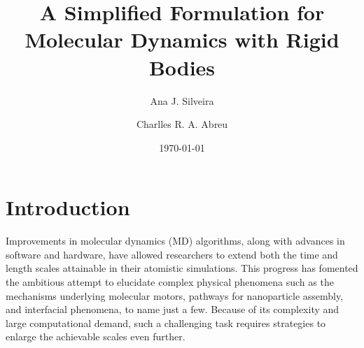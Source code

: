 \documentclass[aip,jcp,reprint,amsmath,amssymb]{revtex4-1}
\begin{document}
\title{A Simplified Formulation for Molecular Dynamics with Rigid Bodies}

\author{Ana J. Silveira}

\author{Charlles R. A. Abreu}

\date{\today}

\maketitle

\section{Introduction}

Improvements in molecular dynamics (MD) algorithms, along with advances in software and hardware, have allowed researchers to extend both the time and length scales attainable in their atomistic simulations. This progress has fomented the ambitious attempt to elucidate complex physical phenomena such as the mechanisms underlying molecular motors, pathways for nanoparticle assembly, and interfacial phenomena, to name just a few. Because of its complexity and large computational demand, such a challenging task requires strategies to enlarge the achievable scales even further.
\end{document}
